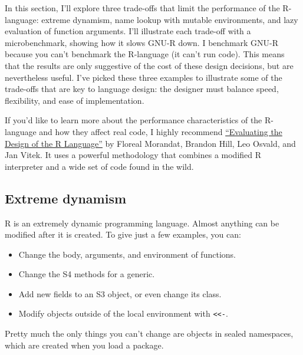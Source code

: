 
In this section, I'll explore three trade-offs that limit the
performance of the R-language: extreme dynamism, name lookup with
mutable environments, and lazy evaluation of function arguments. I'll
illustrate each trade-off with a microbenchmark, showing how it slows
GNU-R down. I benchmark GNU-R because you can't benchmark the R-language
(it can't run code). This means that the results are only suggestive of
the cost of these design decisions, but are nevertheless useful. I've
picked these three examples to illustrate some of the trade-offs that
are key to language design: the designer must balance speed,
flexibility, and ease of implementation.

If you'd like to learn more about the performance characteristics of the
R-language and how they affect real code, I highly recommend
\href{http://r.cs.purdue.edu/pub/ecoop12.pdf}{``Evaluating the Design of
the R Language''} by Floreal Morandat, Brandon Hill, Leo Osvald, and Jan
Vitek. It uses a powerful methodology that combines a modified R
interpreter and a wide set of code found in the wild.

\subsection{Extreme dynamism}\label{extreme-dynamism}

R is an extremely dynamic programming language. Almost anything can be
modified after it is created. To give just a few examples, you can:

\begin{itemize}
\itemsep1pt\parskip0pt
\item
  Change the body, arguments, and environment of functions.
\item
  Change the S4 methods for a generic.
\item
  Add new fields to an S3 object, or even change its class.
\item
  Modify objects outside of the local environment with
  \texttt{\textless{}\textless{}-}.
\end{itemize}

Pretty much the only things you can't change are objects in sealed
namespaces, which are created when you load a package.

